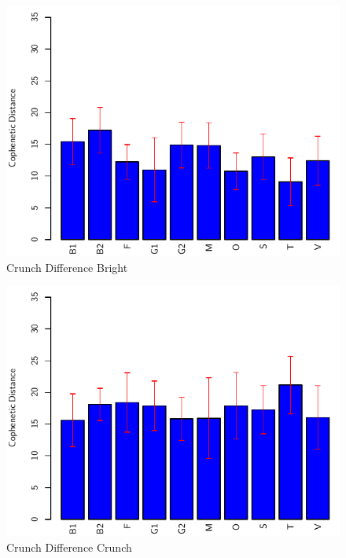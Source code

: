 		\begin{figure}[h!]
			\centering
			\includegraphics{chapter7/Images/CrunchDifferenceBrightBar.pdf}
			\caption{Crunch Difference Bright}
		\end{figure}

		\begin{figure}[h!]
			\centering
			\includegraphics{chapter7/Images/CrunchDifferenceCrunchBar.pdf}
			\caption{Crunch Difference Crunch}
		\end{figure}
